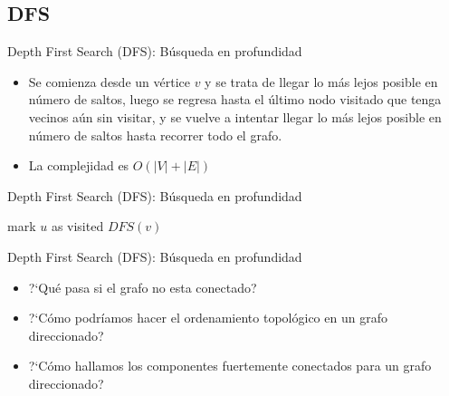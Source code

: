 \documentclass[]{beamer}
\begin{document}
\subsection{DFS}
\begin{frame}{Depth First Search (DFS): B\'usqueda en profundidad}
  \begin{itemize}
    \item Se comienza desde un v\'ertice $v$ y se trata de llegar lo m\'as lejos posible en n\'umero de saltos, luego se regresa hasta el \'ultimo nodo visitado que tenga vecinos a\'un sin visitar, y se vuelve a intentar llegar lo m\'as lejos posible en n\'umero de saltos hasta recorrer todo el grafo.
      \pause
    \item La complejidad es $O(|V| + |E|)$
  \end{itemize}
\end{frame}

\begin{frame}{Depth First Search (DFS): B\'usqueda en profundidad}
  \begin{algorithm}[H]
    mark $u$ as visited \;
    {
      {
        $ DFS(v) $
      }
    }
  \end{algorithm}
\end{frame}

\begin{frame}{Depth First Search (DFS): B\'usqueda en profundidad}
  \begin{itemize}
    \item ?`Qu\'e pasa si el grafo no esta conectado?
      \pause
    \item ?`C\'omo podr\'iamos hacer el ordenamiento topol\'ogico en un grafo direccionado?
      \pause
    \item ?`C\'omo hallamos los componentes fuertemente conectados para un grafo direccionado?
  \end{itemize}
\end{frame}
\end{document}
